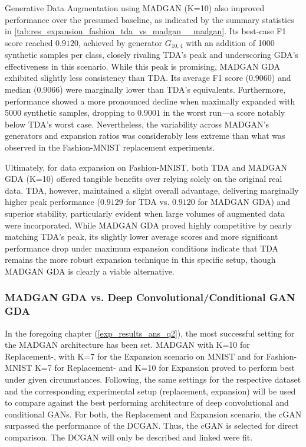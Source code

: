 Generative Data Augmentation using MADGAN (K=10) also improved performance over the presumed baseline, as indicated by the summary statistics in \ref{tab:res_expansion_fashion_tda_vs_madgan__madgan}. Its best-case F1 score reached $0.9120$, achieved by generator \(G_{10,4}\) with an addition of 1000 synthetic samples per class, closely rivaling TDA's peak and underscoring GDA's effectiveness in this scenario. While this peak is promising, MADGAN GDA exhibited slightly less consistency than TDA. Its average F1 score ($0.9060$) and median ($0.9066$) were marginally lower than TDA's equivalents. Furthermore, performance showed a more pronounced decline when maximally expanded with 5000 synthetic samples, dropping to $0.9001$ in the worst run—a score notably below TDA's worst case. Nevertheless, the variability across MADGAN's generators and expansion ratios was considerably less extreme than what was observed in the Fashion-MNIST replacement experiments.

Ultimately, for data expansion on Fashion-MNIST, both TDA and MADGAN GDA (K=10) offered tangible benefits over relying solely on the original real data. TDA, however, maintained a slight overall advantage, delivering marginally higher peak performance ($0.9129$ for TDA vs. $0.9120$ for MADGAN GDA) and superior stability, particularly evident when large volumes of augmented data were incorporated. While MADGAN GDA proved highly competitive by nearly matching TDA's peak, its slightly lower average scores and more significant performance drop under maximum expansion conditions indicate that TDA remains the more robust expansion technique in this specific setup, though MADGAN GDA is clearly a viable alternative.


\newpage
\subsubsection[Question 3]{MADGAN GDA vs. Deep Convolutional/Conditional GAN GDA} \label{exp_results_ans_q3}
In the foregoing chapter (\ref{exp_results_ans_q2}), the most successful setting for the MADGAN architecture has been set. MADGAN with K=10 for Replacement-, with K=7 for the Expansion scenario on MNIST and for Fashion-MNIST K=7 for Replacement- and K=10 for Expansion proved to perform best under given circumstances. Following, the same settings for the respective dataset and the corresponding experimental setup (replacement, expansion) will be used to compare against the best performing architecture of deep convolutional and conditional GANs. For both, the Replacement and Expansion scenario, the cGAN surpassed the performance of the DCGAN. Thus, the cGAN is selected for direct comparison. The DCGAN will only be described and linked were fit.

